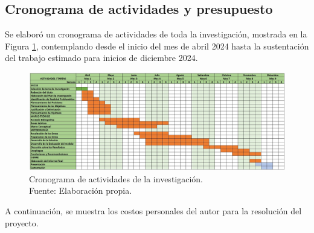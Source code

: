 \begin{landscape}
	\section{Cronograma de actividades y presupuesto}
	Se elaboró un cronograma de actividades de toda la investigación, mostrada en la Figura \ref{1:fig1}, contemplando desde el inicio del mes de abril 2024 hasta la sustentación del trabajo estimado para inicios de diciembre 2024.
	
	\begin{figure}[!ht]
		\begin{center}
			\includegraphics[width=1.55\textwidth]{3/figures/crono.jpg}
			\caption[Cronograma de actividades de la investigación]{Cronograma de actividades de la investigación.\\
				Fuente: Elaboración propia.}
			\label{1:fig1}
		\end{center}
	\end{figure}
	
\end{landscape}

A continuación, se muestra los costos personales del autor para la resolución del proyecto.


